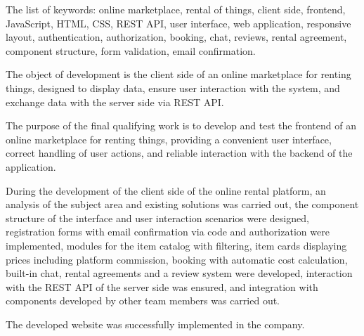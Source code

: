 The list of keywords: online marketplace, rental of things, client side, frontend, JavaScript, HTML, CSS, REST API, user interface, web application, responsive layout, authentication, authorization, booking, chat, reviews, rental agreement, component structure, form validation, email confirmation.

The object of development is the client side of an online marketplace for renting things, designed to display data, ensure user interaction with the system, and exchange data with the server side via REST API.

The purpose of the final qualifying work is to develop and test the frontend of an online marketplace for renting things, providing a convenient user interface, correct handling of user actions, and reliable interaction with the backend of the application.

During the development of the client side of the online rental platform, an analysis of the subject area and existing solutions was carried out, the component structure of the interface and user interaction scenarios were designed, registration forms with email confirmation via code and authorization were implemented, modules for the item catalog with filtering, item cards displaying prices including platform commission, booking with automatic cost calculation, built-in chat, rental agreements and a review system were developed, interaction with the REST API of the server side was ensured, and integration with components developed by other team members was carried out.

The developed website was successfully implemented in the company.
